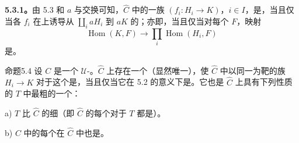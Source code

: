 \textbf{5.3.1。}由 5.3 和 $a$ 与交换可知，$\widehat C$ 中的一族 $(f_i:H_i\to K)$，$i\in I$，是，当且仅当各 $f_i$ 在上诱导从 $\coprod_i aH_i$ 到 $aK$ 的；亦即，当且仅当对每个 $F$，映射
\[\operatorname{Hom}(K,F)\longrightarrow\prod_i\operatorname{Hom}(H_i,F)\]
是。
\begin{SGAresult}{命题}{5.4}
设 $C$ 是一个 $\mathcal U$-。$\widehat C$ 上存在一个（显然唯一），使 $\widehat C$ 中以同一为靶的族 $H_i\to K$ 对于这个是，当且仅当它在 5.2 的意义下是。它也是 $\widehat C$ 上具有下列性质的 $T$ 中最粗的一个：
\par a) $T$ 比 $\widehat C$ 的细（即 $\widehat C$ 的每个对于 $T$ 都是）。
\par b) $C$ 中的每个在 $\widehat C$ 中也是。
\end{SGAresult}
